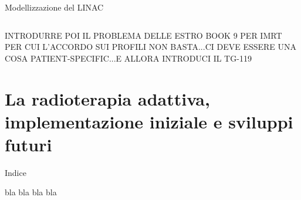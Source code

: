 \documentclass{beamer}
\begin{document}
\begin{frame}[t]{Modellizzazione del LINAC}
\begin{columns}
\end{columns}
\end{frame}

INTRODURRE POI IL PROBLEMA DELLE ESTRO BOOK 9 PER IMRT PER CUI L'ACCORDO SUI PROFILI NON BASTA...CI DEVE ESSERE UNA COSA PATIENT-SPECIFIC...E ALLORA INTRODUCI IL TG-119








\section[La radioterapia adattiva]{La radioterapia adattiva, implementazione iniziale e sviluppi futuri}
\begin{frame}{Indice}
\tableofcontents[currentsection]
\end{frame}

\begin{frame}{bla bla}
bla bla
\end{frame}
\end{document}
